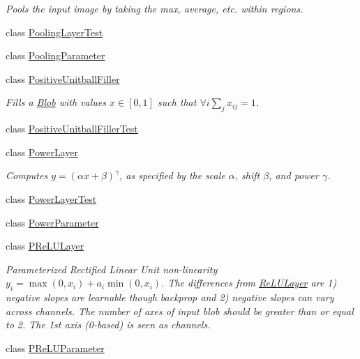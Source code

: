 \begin{DoxyCompactItemize}
\begin{DoxyCompactList}\small\item\em Pools the input image by taking the max, average, etc. within regions. \end{DoxyCompactList}\item 
class \mbox{\hyperlink{classcaffe_1_1_pooling_layer_test}{Pooling\+Layer\+Test}}
\item 
class \mbox{\hyperlink{classcaffe_1_1_pooling_parameter}{Pooling\+Parameter}}
\item 
class \mbox{\hyperlink{classcaffe_1_1_positive_unitball_filler}{Positive\+Unitball\+Filler}}
\begin{DoxyCompactList}\small\item\em Fills a \mbox{\hyperlink{classcaffe_1_1_blob}{Blob}} with values $ x \in [0, 1] $ such that $ \forall i \sum_j x_{ij} = 1 $. \end{DoxyCompactList}\item 
class \mbox{\hyperlink{classcaffe_1_1_positive_unitball_filler_test}{Positive\+Unitball\+Filler\+Test}}
\item 
class \mbox{\hyperlink{classcaffe_1_1_power_layer}{Power\+Layer}}
\begin{DoxyCompactList}\small\item\em Computes $ y = (\alpha x + \beta) ^ \gamma $, as specified by the scale $ \alpha $, shift $ \beta $, and power $ \gamma $. \end{DoxyCompactList}\item 
class \mbox{\hyperlink{classcaffe_1_1_power_layer_test}{Power\+Layer\+Test}}
\item 
class \mbox{\hyperlink{classcaffe_1_1_power_parameter}{Power\+Parameter}}
\item 
class \mbox{\hyperlink{classcaffe_1_1_p_re_l_u_layer}{P\+Re\+L\+U\+Layer}}
\begin{DoxyCompactList}\small\item\em Parameterized Rectified Linear Unit non-\/linearity $ y_i = \max(0, x_i) + a_i \min(0, x_i) $. The differences from \mbox{\hyperlink{classcaffe_1_1_re_l_u_layer}{Re\+L\+U\+Layer}} are 1) negative slopes are learnable though backprop and 2) negative slopes can vary across channels. The number of axes of input blob should be greater than or equal to 2. The 1st axis (0-\/based) is seen as channels. \end{DoxyCompactList}\item 
class \mbox{\hyperlink{classcaffe_1_1_p_re_l_u_parameter}{P\+Re\+L\+U\+Parameter}}
\item 

\end{DoxyCompactItemize}
